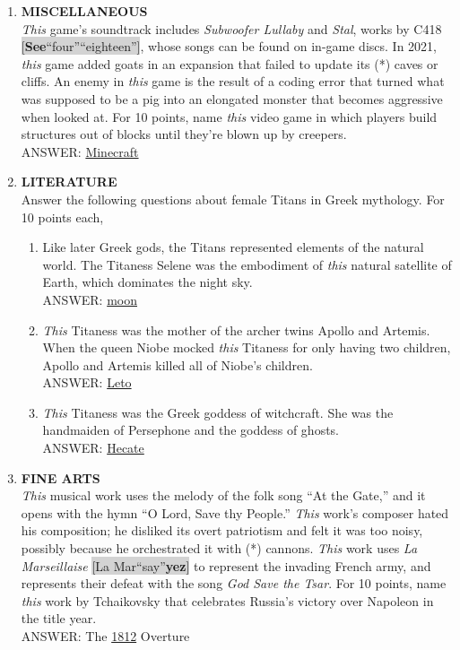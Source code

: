 \documentclass{report}
\newcommand*{\backtrack}{\setcounter{enumi}{\numexpr\theenumi-1\relax}}
\begin{document}
\begin{enumerate}
    \item \textbf{MISCELLANEOUS} \\ \textit{This} game’s soundtrack includes \textit{Subwoofer Lullaby} and \textit{Stal}, works by C418 \colorbox{lightGray}{[\textbf{See}\textperiodcentered ``four''\textperiodcentered ``eighteen'']}, whose songs can be found on in-game discs. In 2021, \textit{this} game added goats in an expansion that failed to update its (*) caves or cliffs. An enemy in \textit{this} game is the result of a coding error that turned what was supposed to be a pig into an elongated monster that becomes aggressive when looked at. For 10 points, name \textit{this} video game in which players build structures out of blocks until they’re blown up by creepers. \\ ANSWER: \underline{Minecraft} \backtrack
    \item \textbf{LITERATURE} \\ Answer the following questions about female Titans in Greek mythology. For 10 points each,
    \begin{enumerate}[label=\Alph*]
        \item Like later Greek gods, the Titans represented elements of the natural world. The Titaness Selene was the embodiment of \textit{this} natural satellite of Earth, which dominates the night sky. \\ ANSWER: \underline{moon}
        \item \textit{This} Titaness was the mother of the archer twins Apollo and Artemis. When the queen Niobe mocked \textit{this} Titaness for only having two children, Apollo and Artemis killed all of Niobe’s children. \\ ANSWER: \underline{Leto}
        \item \textit{This} Titaness was the Greek goddess of witchcraft. She was the handmaiden of Persephone and the goddess of ghosts. \\ ANSWER: \underline{Hecate}
    \end{enumerate}

    \item \textbf{FINE ARTS} \\ \textit{This} musical work uses the melody of the folk song “At the Gate,” and it opens with the hymn “O Lord, Save thy People.” \textit{This} work’s composer hated his composition; he disliked its overt patriotism and felt it was too noisy, possibly because he orchestrated it with (*) cannons. \textit{This} work uses \textit{La Marseillaise} \colorbox{lightGray}{[La Mar\textperiodcentered ``say''\textperiodcentered\textbf{yez}]} to represent the invading French army, and represents their defeat with the song \textit{God Save the Tsar}. For 10 points, name \textit{this} work by Tchaikovsky that celebrates Russia’s victory over Napoleon in the title year. \\ ANSWER: The \underline{1812} Overture \backtrack

    
\end{enumerate}
\end{document}
